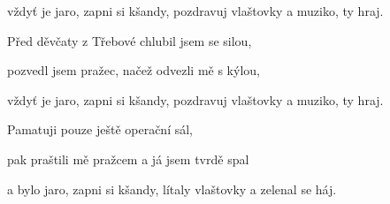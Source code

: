 vždyť je jaro, zapni si kšandy,
pozdravuj vlaštovky a muziko, ty hraj.
\ks

\zs
Před děvčaty z Třebové chlubil jsem se silou,

pozvedl jsem pražec, načež odvezli mě s kýlou,

vždyť je jaro, zapni si kšandy,
pozdravuj vlaštovky a muziko, ty hraj.
\ks

\zs
Pamatuji pouze ještě operační sál,

pak praštili mě pražcem a já jsem tvrdě spal

a bylo jaro, zapni si kšandy,
lítaly vlaštovky a zelenal se háj.
\ks

\kp


















